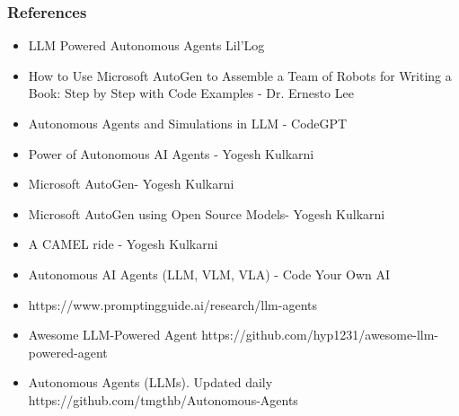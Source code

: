\begin{frame}[fragile]\frametitle{References}
\begin{itemize}
\item LLM Powered Autonomous Agents Lil'Log
\item How to Use Microsoft AutoGen to Assemble a Team of Robots for Writing a Book: Step by Step with Code Examples - Dr. Ernesto Lee
\item Autonomous Agents and Simulations in LLM - CodeGPT
\item Power of Autonomous AI Agents - Yogesh Kulkarni
\item Microsoft AutoGen- Yogesh Kulkarni
\item Microsoft AutoGen using Open Source Models- Yogesh Kulkarni
\item A CAMEL ride - Yogesh Kulkarni
\item Autonomous AI Agents (LLM, VLM, VLA) - Code Your Own AI
\item https://www.promptingguide.ai/research/llm-agents
\item Awesome LLM-Powered Agent https://github.com/hyp1231/awesome-llm-powered-agent
\item Autonomous Agents (LLMs). Updated daily https://github.com/tmgthb/Autonomous-Agents
\end{itemize}
\end{frame}